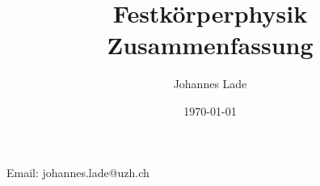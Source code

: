 \documentclass[10pt,a4paper]{article}
\author{Johannes Lade}
\title{Festkörperphysik Zusammenfassung}
\date{\today{}}
\begin{document}
	
\begin{titlepage}
	\maketitle
		\begin{center}
			Email: johannes.lade@uzh.ch
		\end{center}
	\thispagestyle{empty}
\end{titlepage}

\tableofcontents
\newpage
	
	





	
\end{document}
